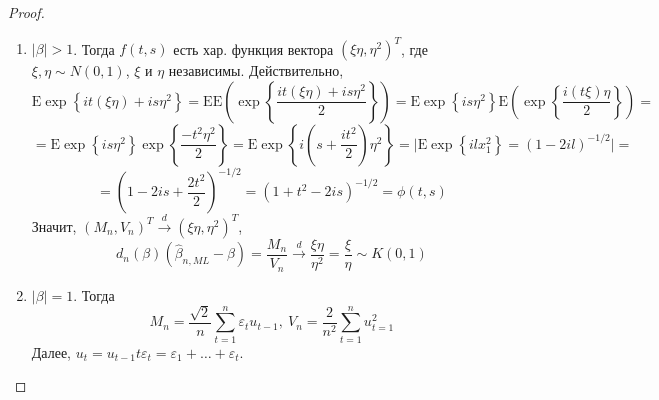 \documentclass[12pt]{article}
\newtheorem*{theorem*}{Теорема}
\def\eps{ \varepsilon }
\def\E{ \mathrm{E} }
\def\P{ \mathrm{P} }
\begin{document}
\begin{proof}
\begin{enumerate}
\begin{theorem*}[О наследовании сходимости]
        \end{theorem*}
        В силу \eqref{def::mutual_char_func} $(M_n,V_n)^T\xrightarrow{d}(\xi,1)^T$.
        Если $H(x,y)=\frac{x}{y}$, то $H(x,y)$  непрерывна при $y>0$.  Можно взять
        $A=\{y:y>0\},\ \P((\xi,1)^T\in A)=1$. В силу теоремы о наследовании
        слабой сходимости
        \[d_n(\beta)(\widehat{\beta}_{n,ML}-\beta)=\frac{M_n}{V_n}=H(M_n, V_n)\xrightarrow{d}H(\xi,1)=\xi\] 
        \item \underline{$\left\lvert \beta\right\rvert >1$}. Тогда $f(t,s)$ есть хар. функция 
        вектора $(\xi\eta,\eta^2)^T$, где $\xi,\eta\sim N(0,1)$, $\xi$ и $\eta$
        независимы. Действительно,
        \[\E\exp{\left\{it(\xi\eta)+is\eta^2\right\}}=\E\E\left(\exp{\left\{\frac{it(\xi\eta)+is\eta^2}{2}\right\}}\right)=\E\exp{\left\{is\eta^2\right\}}\E\left(\exp{\left\{\frac{i(t\xi)\eta}{2}\right\}}\right)=\]
        \[=\E\exp{\left\{is\eta^2\right\}}\exp{\left\{\frac{-t^2\eta^2}{2}\right\}}=\E\exp{\left\{i\left(s+\frac{it^2}{2}\right)\eta^2\right\}}=\Big\lvert\E\exp{\left\{ilx_1^2\right\}}=(1-2il)^{-1/2}\Big\rvert=\]
        \[=\left(1-2is+\frac{2t^2}{2}\right)^{-1/2}=(1+t^2-2is)^{-1/2}=\phi(t,s)\]
        Значит, $(M_n,V_n)^T\xrightarrow{d}(\xi\eta,\eta^2)^T$,
        \[d_n(\beta)(\widehat{\beta}_{n,ML}-\beta)=\frac{M_n}{V_n}\xrightarrow{d}\frac{\xi\eta}{\eta^2}=\frac{\xi}{\eta}\sim K(0,1)\]
        \item \underline{$\left\lvert \beta\right\rvert =1$}. Тогда
        \[M_n=\frac{\sqrt{2}}{n}\sum_{t=1}^n\eps_tu_{t-1},\ V_n=\frac{2}{n^2}\sum_{t=1}^nu_{t=1}^2\]
        Далее, $u_t=u_{t-1}t\eps_t=\eps_1+\ldots+\eps_t$.


\end{enumerate}
\end{proof}
\end{document}
